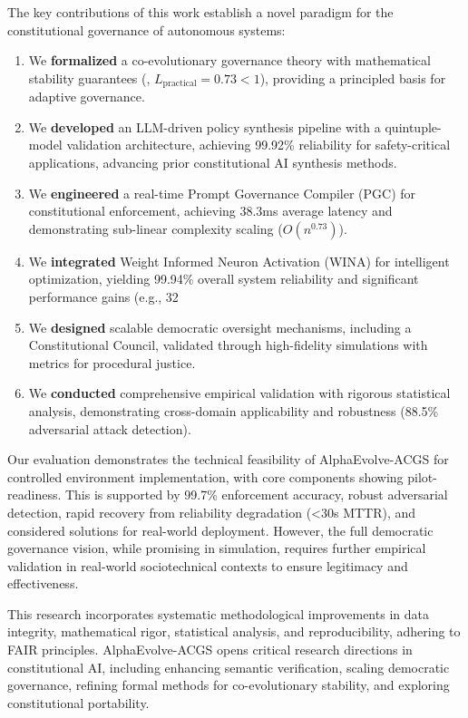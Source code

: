 \documentclass[manuscript,screen,review,anonymous,9pt]{acmart}
\begin{document}
The key contributions of this work establish a novel paradigm for the constitutional governance of autonomous systems:
\begin{enumerate}[leftmargin=*,itemsep=2pt,parsep=1pt]
    \item We \textbf{formalized} a co-evolutionary governance theory with mathematical stability guarantees (, $L_{\text{practical}} = 0.73 < 1$), providing a principled basis for adaptive governance.
    \item We \textbf{developed} an LLM-driven policy synthesis pipeline with a quintuple-model validation architecture, achieving 99.92\% reliability for safety-critical applications, advancing prior constitutional AI synthesis methods.
    \item We \textbf{engineered} a real-time Prompt Governance Compiler (PGC) for constitutional enforcement, achieving 38.3ms average latency and demonstrating sub-linear complexity scaling ($O(n^{0.73})$).
    \item We \textbf{integrated} Weight Informed Neuron Activation (WINA) for intelligent optimization, yielding 99.94\% overall system reliability and significant performance gains (e.g., 32%
    \item We \textbf{designed} scalable democratic oversight mechanisms, including a Constitutional Council, validated through high-fidelity simulations with metrics for procedural justice.
    \item We \textbf{conducted} comprehensive empirical validation with rigorous statistical analysis, demonstrating cross-domain applicability and robustness (88.5\% adversarial attack detection).
\end{enumerate}

Our evaluation demonstrates the technical feasibility of AlphaEvolve-ACGS for controlled environment implementation, with core components showing pilot-readiness. This is supported by 99.7\% enforcement accuracy, robust adversarial detection, rapid recovery from reliability degradation (<30s MTTR), and considered solutions for real-world deployment. However, the full democratic governance vision, while promising in simulation, requires further empirical validation in real-world sociotechnical contexts to ensure legitimacy and effectiveness.

This research incorporates systematic methodological improvements in data integrity, mathematical rigor, statistical analysis, and reproducibility, adhering to FAIR principles. AlphaEvolve-ACGS opens critical research directions in constitutional AI, including enhancing semantic verification, scaling democratic governance, refining formal methods for co-evolutionary stability, and exploring constitutional portability.
\end{document}
